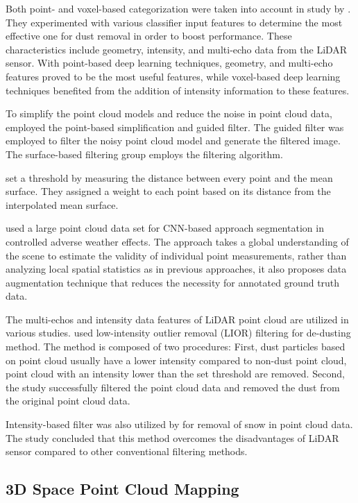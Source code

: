 Both point- and voxel-based categorization were taken into account in study by \citet{stanislas2021}. They experimented with various classifier input features to determine the most effective one for dust removal in order to boost performance. These characteristics include geometry, intensity, and multi-echo data from the LiDAR sensor. With point-based deep learning techniques, geometry, and multi-echo features proved to be the most useful features, while voxel-based deep learning techniques benefited from the addition of intensity information to these features.

To simplify the point cloud models and reduce the noise in point cloud data, \citet{zhu2020} employed the point-based simplification and guided filter. The guided filter was employed to filter the noisy point cloud model and generate the filtered image. The surface-based filtering group employs the filtering algorithm.

\citet{ramiya2017} set a threshold by measuring the distance between every point and the mean surface. They assigned a weight to each point based on its distance from the interpolated mean surface.

\citet{heinzler2020} used a large point cloud data set for CNN-based approach segmentation in controlled adverse weather effects. The approach takes a global understanding of the scene to estimate the validity of individual point measurements, rather than analyzing local spatial statistics as in previous approaches, it also proposes data augmentation technique that reduces the necessity for annotated ground truth data.

The multi-echos and intensity data features of LiDAR point cloud are utilized in various studies. \citet{afzalaghaeinaeini2021} used low-intensity outlier removal (LIOR) filtering for de-dusting method. The method is composed of two procedures: First, dust particles based on point cloud usually have a lower intensity compared to non-dust point cloud, point cloud with an intensity lower than the set threshold are removed. Second,  the study successfully filtered the point cloud data and removed the dust from the original point cloud data. 

Intensity-based filter was also utilized by \citet{park2020} for removal of snow in point cloud data. The study concluded that this method overcomes the disadvantages of LiDAR sensor compared to other conventional filtering methods.

\subsection{3D Space Point Cloud Mapping}


